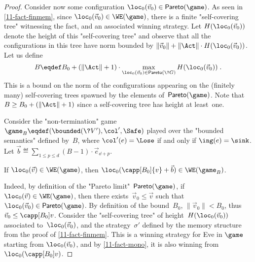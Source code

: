 \begin{proof}

  Consider now some configuration $\loc_0(\vec
  v_0)\in\mathsf{Pareto}(\game)$.  As seen in \cref{11-fact-finmem},
  since $\loc_0(\vec v_0)\in\WE(\game)$, there is a finite
  "self-covering tree" witnessing the fact, and an associated winning
  strategy.  Let $H(\loc_0(\vec v_0))$ denote the height of this
  "self-covering tree" and observe that all the configurations in this
  tree have norm bounded by $\|\vec v_0\|+\|\Act\|\cdot H(\loc_0(\vec
  v_0))$.
  Let us define
  \begin{equation}\label{11-b}
   B\eqdef B_0+(\|\Act\|+1)\cdot \max_{\loc_0(\vec
  v_0)\in\mathsf{Pareto}(\?G)}H(\loc_0(\vec v_0))\;.
  \end{equation}
  This is a bound on the norm of the configurations appearing on the
  (finitely many) self-covering trees spawned by the elements
  of~$\mathsf{Pareto}(\game)$.  Note that $B\geq B_0+(\|\Act\|+1)$ since
  a self-covering tree has height at least~one.

  Consider the "non-termination" game
  $\game_B\eqdef(\bounded(\?V'),\col',\Safe)$ played over the
  "bounded semantics" defined by~$B$, where $\col'(e)=\Lose$ if and
  only if $\ing(e)=\sink$.  Let $\vec b\eqdef\sum_{1\leq p\leq
  d}(B-1)\cdot\vec e_{\dd+p}$.
  {\renewcommand{\qedsymbol}{}
  \begin{claim}\label{11-cl-parity2bounding} If $\loc_0(\vec
    v)\in\WE(\game)$, then
    $\loc_0(\capp[B_0]{v}+\vec b)\in\WE(\game_B)$.
  \end{claim}}
  Indeed, by definition of the "Pareto
  limit"~$\mathsf{Pareto}(\game)$, if $\loc_0(\vec v)\in\WE(\game)$,
  then there exists~$\vec v_0\leq\vec v$ such that $\loc_0(\vec
  v_0)\in\mathsf{Pareto}(\game)$.  By definition of the bound~$B_0$,
  $\|\vec v_0\|<B_0$, thus $\vec v_0\leq\capp[B_0]v$.  Consider the
  "self-covering tree" of height~$H(\loc_0(\vec v_0))$ associated
  to~$\loc_0(\vec v_0)$, and the strategy~$\sigma'$ defined by the
  memory structure from the
  proof of \cref{11-fact-finmem}.  This is a winning strategy for Eve
  in $\game$ starting from $\loc_0(\vec v_0)$, and
  by \cref{11-fact-mono}, it is also winning
  from~$\loc_0(\capp[B_0]v)$.
    

\end{proof}
